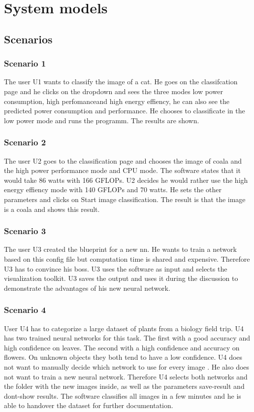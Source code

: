 \documentclass[parskip=full]{scrartcl}
\begin{document}
\section{System models}
\subsection{Scenarios}
\subsubsection{Scenario 1}
The user U1 wants to classify the image of a cat. He goes on the classifcation page and he clicks on the dropdown and sees the three modes \glqq low power consumption\grqq , \glqq high perfomance\grqq and \glqq high energy effiency\grqq , he can also see the predicted power consumption and performance. He chooses to classificate in the low power mode and runs the programm. The results are shown.
\subsubsection{Scenario 2}
The user U2 goes to the classification page and chooses the image of coala and the high power performance mode and CPU mode. The software states that it would take 86 watts with 166 GFLOPs. U2 decides he would rather use the high energy effiency mode with 140 GFLOPs and 70 watts. He sets the other parameters and clicks on Start image classification. The result is that the image is a coala and shows this result. 
\subsubsection{Scenario 3}
The user U3 created the blueprint for a new nn.
He wants to train a network based on this config file but computation time is shared and expensive. Therefore U3 has to convince his boss.
U3 uses the software as input and selects the visualization toolkit.
U3 saves the output and uses it during the discussion to demonstrate the advantages of his new neural network.
\clearpage
\subsubsection{Scenario 4}
User U4 has to categorize a large dataset of plants from a biology field trip. U4 has two trained neural networks for this task. The first with a good accuracy and high confidence on leaves. The second with a high confidence and accuracy on flowers. On unknown objects they both tend to have a low confidence. U4 does not want to manually decide which network to use for every image . He also does not want to train a new neural network. Therefore U4 selects both networks and the folder with the new images inside, as well as the parameters save-result and dont-show results. The software classifies all images in a few minutes and he is able to handover the dataset for further documentation.
\end{document}
